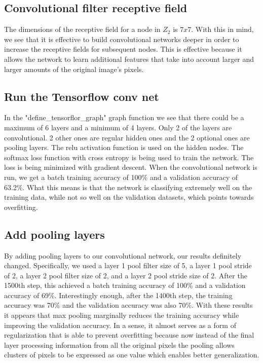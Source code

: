 \documentclass{article}
\begin{document}
\subsection{Convolutional filter receptive field}
The dimensions of the receptive field for a node in $Z_2$ is $7 x 7$. With this in mind, we see that it is effective to build convolutional networks deeper in order to increase the receptive fields for subsequent nodes. This is effective because it allows the network to learn additional features that take into account larger and larger amounts of the original image's pixels.

\subsection{Run the Tensorflow conv net}
In the "define\_tensorflor\_graph" graph function we see that there could be a maximum of 6 layers and a minimum of 4 layers. Only 2 of the layers are convolutional. 2 other ones are regular hidden ones and the 2 optional ones are pooling layers. The relu activation function is used on the hidden nodes. The softmax loss function with cross entropy is being used to train the network. The loss is being minimized with gradient descent. When the convolutional network is run, we get a batch training accuracy of 100\% and a validation accuracy of 63.2\%. What this means is that the network is classifying extremely well on the training data, while not so well on the validation datasets, which points towards overfitting.

\subsection{Add pooling layers}
By adding pooling layers to our convolutional network, our results definitely changed. Specifically, we used a layer 1 pool filter size of 5, a layer 1 pool stride of 2, a layer 2 pool filter size of 2, and a layer 2 pool stride size of 2. After the 1500th step, this achieved a batch training accuracy of 100\% and a validation accuracy of 69\%. Interestingly enough, after the 1400th step, the training accuracy was 70\% and the validation accuracy was also 70\%. With these results it appears that max pooling marginally reduces the training accuracy while improving the validation accuracy. In a sense, it almost serves as a form of regularization that is able to prevent overfitting because now instead of the final layer processing information from all the original pixels the pooling allows clusters of pixels to be expressed as one value which enables better generalization.
\end{document}
